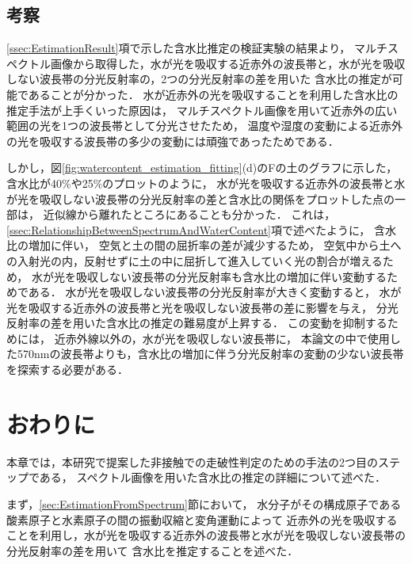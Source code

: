 \clearpage


\subsection{考察}
\label{ssec:EstimationConsideration}

\ref{ssec:EstimationResult}項で示した含水比推定の検証実験の結果より，
マルチスペクトル画像から取得した，水が光を吸収する近赤外の波長帯と，水が光を吸収しない波長帯の分光反射率の，2つの分光反射率の差を用いた
含水比の推定が可能であることが分かった．
水が近赤外の光を吸収することを利用した含水比の推定手法が上手くいった原因は，
マルチスペクトル画像を用いて近赤外の広い範囲の光を1つの波長帯として分光させたため，
温度や湿度の変動による近赤外の光を吸収する波長帯の多少の変動には頑強であったためである．

しかし，図\ref{fig:watercontent_estimation_fitting}(d)のFの土のグラフに示した，含水比が40$\%$や25$\%$のプロットのように，
水が光を吸収する近赤外の波長帯と水が光を吸収しない波長帯の分光反射率の差と含水比の関係をプロットした点の一部は，
近似線から離れたところにあることも分かった．
これは，\ref{ssec:RelationshipBetweenSpectrumAndWaterContent}項で述べたように，
含水比の増加に伴い，
空気と土の間の屈折率の差が減少するため，
空気中から土への入射光の内，反射せずに土の中に屈折して進入していく光の割合が増えるため，
水が光を吸収しない波長帯の分光反射率も含水比の増加に伴い変動するためである．
水が光を吸収しない波長帯の分光反射率が大きく変動すると，
水が光を吸収する近赤外の波長帯と光を吸収しない波長帯の差に影響を与え，
分光反射率の差を用いた含水比の推定の難易度が上昇する．
この変動を抑制するためには，
近赤外線以外の，水が光を吸収しない波長帯に，
本論文の中で使用した570nmの波長帯よりも，含水比の増加に伴う分光反射率の変動の少ない波長帯を探索する必要がある．

\newpage


\section{おわりに}

本章では，本研究で提案した非接触での走破性判定のための手法の2つ目のステップである，
スペクトル画像を用いた含水比の推定の詳細について述べた．

まず，\ref{sec:EstimationFromSpectrum}節において，
水分子がその構成原子である酸素原子と水素原子の間の振動収縮と変角運動によって
近赤外の光を吸収することを利用し，水が光を吸収する近赤外の波長帯と水が光を吸収しない波長帯の分光反射率の差を用いて
含水比を推定することを述べた．

